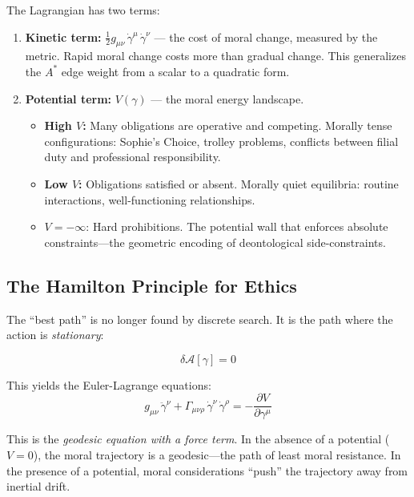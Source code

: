 \documentclass[12pt,letterpaper]{article}
\theoremstyle{definition}
\newcommand{\calA}{\mathcal{A}}
\begin{document}
The Lagrangian has two terms:

\begin{enumerate}
    \item \textbf{Kinetic term:} $\frac{1}{2} g_{\mu\nu}\, \dot{\gamma}^\mu\, \dot{\gamma}^\nu$ --- the cost of moral change, measured by the metric. Rapid moral change costs more than gradual change. This generalizes the $A^*$ edge weight from a scalar to a quadratic form.

    \item \textbf{Potential term:} $V(\gamma)$ --- the moral energy landscape.
    \begin{itemize}
        \item \textbf{High $V$:} Many obligations are operative and competing. Morally tense configurations: Sophie's Choice, trolley problems, conflicts between filial duty and professional responsibility.
        \item \textbf{Low $V$:} Obligations satisfied or absent. Morally quiet equilibria: routine interactions, well-functioning relationships.
        \item $V = -\infty$: Hard prohibitions. The potential wall that enforces absolute constraints---the geometric encoding of deontological side-constraints.
    \end{itemize}
\end{enumerate}

\subsection{The Hamilton Principle for Ethics}

The ``best path'' is no longer found by discrete search. It is the path where the action is \emph{stationary}:

\begin{equation}
\delta \calA[\gamma] = 0
\end{equation}

This yields the Euler-Lagrange equations:
\begin{equation}\label{eq:euler-lagrange}
g_{\mu\nu}\, \ddot{\gamma}^\nu + \Gamma_{\mu\nu\rho}\, \dot{\gamma}^\nu\, \dot{\gamma}^\rho = -\frac{\partial V}{\partial \gamma^\mu}
\end{equation}

This is the \emph{geodesic equation with a force term}. In the absence of a potential ($V = 0$), the moral trajectory is a geodesic---the path of least moral resistance. In the presence of a potential, moral considerations ``push'' the trajectory away from inertial drift.
\end{document}
